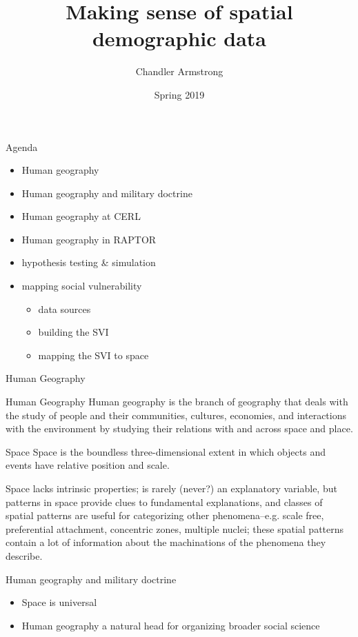 \documentclass{beamer}
\title{Making sense of spatial demographic data}
\subtitle{}
\author{Chandler Armstrong}
\institute{CERL}
\date{Spring 2019}
\begin{document}
\begin{frame}
\titlepage
\end{frame}


\begin{frame}{Agenda}
  \begin{itemize}
  \item Human geography
  \item Human geography and military doctrine
  \item Human geography at CERL
  \item Human geography in RAPTOR
  \item hypothesis testing \& simulation
  \item mapping social vulnerability
    \begin{itemize}
    \item data sources
    \item building the SVI
    \item mapping the SVI to space
    \end{itemize}
  \end{itemize}
\end{frame}


\begin{frame}{Human Geography}
  \begin{definition}{Human Geography}
    Human geography is the branch of geography that deals with the study of people and their communities, cultures, economies, and interactions with the environment by studying their relations with and across space and place.
  \end{definition}
  \begin{definition}{Space}
    Space is the boundless three-dimensional extent in which objects and events have relative position and scale.
  \end{definition}
  Space lacks intrinsic properties; is rarely (never?) an explanatory variable, but patterns in space provide clues to fundamental explanations, and classes of spatial patterns are useful for categorizing other phenomena--e.g. scale free, preferential attachment, concentric zones, multiple nuclei; these spatial patterns contain a lot of information about the machinations of the phenomena they describe.
\end{frame}


\begin{frame}{Human geography and military doctrine}
  \begin{itemize}
  \item Space is universal
  \item Human geography a natural head for organizing broader social science
  \end{itemize}
\end{frame}
\end{document}
